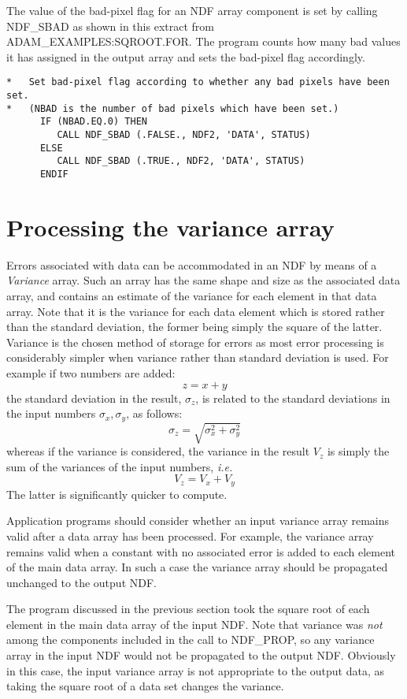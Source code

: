 The value of the bad-pixel flag for an NDF array component 
is set by calling NDF\_SBAD as shown in this extract 
from ADAM\_EXAMPLES:SQROOT.FOR.  The program  counts how many bad values 
it has assigned in the output array and sets the bad-pixel flag accordingly.
\begin{verbatim}
*   Set bad-pixel flag according to whether any bad pixels have been set.
*   (NBAD is the number of bad pixels which have been set.)
      IF (NBAD.EQ.0) THEN
         CALL NDF_SBAD (.FALSE., NDF2, 'DATA', STATUS)
      ELSE
         CALL NDF_SBAD (.TRUE., NDF2, 'DATA', STATUS)
      ENDIF
\end{verbatim}

\newpage
\section{Processing the variance array\label{variance}}

Errors associated with data can be accommodated in an NDF by means of a
{\sl Variance\/} array.
Such an array has the same shape and size
as the associated data array, and contains an estimate of the variance 
for each element in that data array.
Note that it is the variance for each data element which is stored 
rather than the standard deviation, the former being simply the square
of the latter.
Variance is the chosen method of storage for errors as
most error processing is 
considerably simpler when  variance rather than standard deviation is used.
For example if two numbers are added:
$$z=x+y$$
the standard deviation in the result, $\sigma_z$, is related to the standard
deviations in the input numbers $\sigma_x,\sigma_y$, as follows:
$$\sigma_z=\sqrt{\sigma_x^2+\sigma_y^2}$$
whereas if the variance is considered, the variance in the result
$V_z$ is simply the sum of the variances of the input numbers, {\it i.e.}
$$V_z=V_x+V_y$$
The latter is significantly quicker to compute.


Application programs should consider whether an input variance array
remains valid after a data array has been processed.
For example, the variance array remains valid when a 
constant with no 
associated error is added to each element of the main data array.
In such a case the 
variance array should be propagated unchanged to the output NDF.

The program discussed in the previous section took the square root of each 
element in the main data array of the input NDF.
Note that variance was {\sl not\/} among the components included in the 
call to NDF\_PROP, so any variance array in the input NDF would not
be propagated to the output NDF.
Obviously in this case, the input variance array is not appropriate to the
output data, as taking the square root of a data set 
changes the variance.

